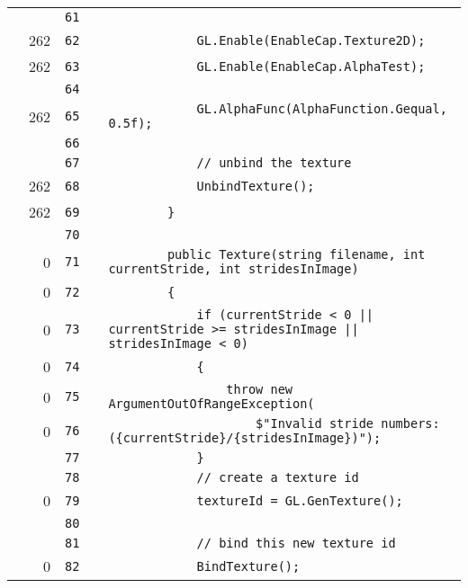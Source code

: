 \documentclass[a4paper,landscape,10pt]{article}
\begin{document}
\begin{longtable}[l]{lrrll}
\cellcolor{gray} &  & \verb~61~ & & \verb~~\\
\cellcolor{green} & 262 & \verb~62~ & & \verb~            GL.Enable(EnableCap.Texture2D);~\\
\cellcolor{green} & 262 & \verb~63~ & & \verb~            GL.Enable(EnableCap.AlphaTest);~\\
\cellcolor{gray} &  & \verb~64~ & & \verb~~\\
\cellcolor{green} & 262 & \verb~65~ & & \verb~            GL.AlphaFunc(AlphaFunction.Gequal, 0.5f);~\\
\cellcolor{gray} &  & \verb~66~ & & \verb~~\\
\cellcolor{gray} &  & \verb~67~ & & \verb~            // unbind the texture~\\
\cellcolor{green} & 262 & \verb~68~ & & \verb~            UnbindTexture();~\\
\cellcolor{green} & 262 & \verb~69~ & & \verb~        }~\\
\cellcolor{gray} &  & \verb~70~ & & \verb~~\\
\cellcolor{red} & 0 & \verb~71~ & & \verb~        public Texture(string filename, int currentStride, int stridesInImage)~\\
\cellcolor{red} & 0 & \verb~72~ & & \verb~        {~\\
\cellcolor{red} & 0 & \verb~73~ & & \verb~            if (currentStride < 0 || currentStride >= stridesInImage || stridesInImage < 0)~\\
\cellcolor{red} & 0 & \verb~74~ & & \verb~            {~\\
\cellcolor{red} & 0 & \verb~75~ & & \verb~                throw new ArgumentOutOfRangeException(~\\
\cellcolor{red} & 0 & \verb~76~ & & \verb~                    $"Invalid stride numbers: ({currentStride}/{stridesInImage})");~\\
\cellcolor{gray} &  & \verb~77~ & & \verb~            }~\\
\cellcolor{gray} &  & \verb~78~ & & \verb~            // create a texture id~\\
\cellcolor{red} & 0 & \verb~79~ & & \verb~            textureId = GL.GenTexture();~\\
\cellcolor{gray} &  & \verb~80~ & & \verb~~\\
\cellcolor{gray} &  & \verb~81~ & & \verb~            // bind this new texture id~\\
\cellcolor{red} & 0 & \verb~82~ & & \verb~            BindTexture();~\\

\end{longtable}
\end{document}
